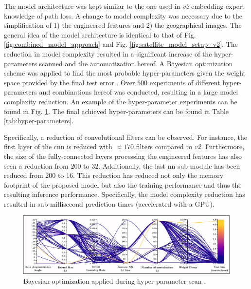 The model architecture was kept similar to the one used in \emph{v2} embedding expert knowledge of path loss. A change to model complexity was necessary due to the simplification of 1) the engineered features and 2) the geographical images. The general idea of the model architecture is identical to that of Fig. \ref{fig:combined_model_approach} and Fig. \ref{fig:satellite_model_setup_v2}. The reduction in model complexity resulted in a significant increase of the hyper-parameters scanned and the automatization hereof. A Bayesian optimization scheme was applied to find the most probable hyper-parameters given the weight space provided by the final test error \cite{YuHyper-ParameterApplications, wandb}. Over $500$ experiments of different hyper-parameters and combinations hereof was conducted, resulting in a large model complexity reduction. An example of the hyper-parameter experiments can be found in Fig. \ref{fig:hyper-paramters_scan}. The final achieved hyper-parameters can be found in Table \ref{tab:hyper-parameters}.

Specifically, a reduction of convolutional filters can be observed. For instance, the first layer of the \gls{cnn} is reduced with $\approx 170$ filters compared to \emph{v2}. Furthermore, the size of the fully-connected layers processing the engineered features has also seen a reduction from $200$ to $32$. Additionally, the last \gls{nn} sub-module has been reduced from $200$ to $16$. This reduction has reduced not only the memory footprint of the proposed model but also the training performance and thus the resulting inference performance. Specifically, the model complexity reduction has resulted in sub-millisecond prediction times (accelerated with a GPU). 

\begin{figure}
    \centering
    \includegraphics{chapters/part_pathloss/osm_images_paper/figures/hyperparameter_scan.eps}
    \caption{Bayesian optimization applied during hyper-parameter scan \cite{wandb}.}
    \label{fig:hyper-paramters_scan}
\end{figure}


